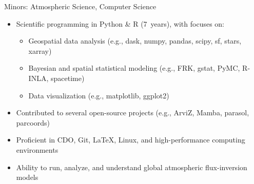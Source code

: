 \documentclass[10pt,letterpaper,ragged2e,withhyper]{altacv}
\begin{document}
\begin{paracol}{2}

  
  \vspace{-0.75em}
  \divider


  \vspace{-0.75em}
  \divider

  {\small Minors: Atmospheric Science, Computer Science}

  \medskip

  \begin{itemize}
    \item Scientific programming in Python \& R (7~years), with focuses on:
      \begin{itemize}
        \item Geospatial data analysis (e.g., dask, numpy, pandas, scipy, sf, stars, xarray)
        \item Bayesian and spatial statistical modeling (e.g., FRK, gstat, PyMC, R-INLA, spacetime)
        \item Data visualization (e.g., matplotlib, ggplot2)
      \end{itemize}
    \item Contributed to several open-source projects (e.g., ArviZ, Mamba, parasol, parcoords)
    \item Proficient in CDO, Git, LaTeX, Linux, and high-performance computing environments
    \item Ability to run, analyze, and understand global atmospheric flux-inversion models
  \end{itemize}


\end{paracol}
\end{document}
